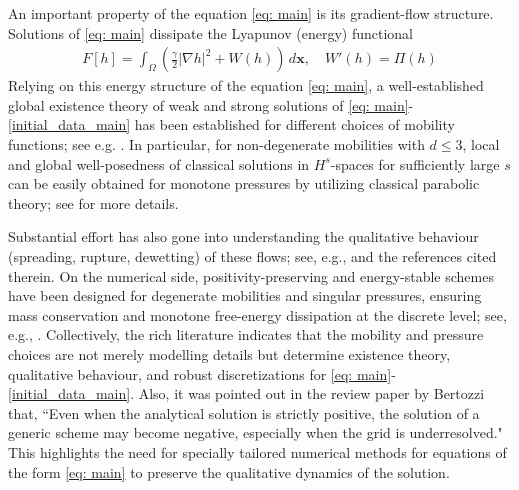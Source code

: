 \documentclass[11pt]{article}
\numberwithin{equation}{section}
\newtheorem{counter example}[theorem]{Counter Example}
\numberwithin{equation}{section}
\numberwithin{equation}{section}
\begin{document}
An important property of the equation \eqref{eq: main} is its gradient-flow structure. Solutions of \eqref{eq: main} dissipate the Lyapunov (energy) functional
\begin{align}\label{energy}
F[h] = \int_{\Omega} \left( \frac{\gamma}{2}|\nabla h|^2 + W(h) \right)\, d\mathbf{x},\quad W'(h)=\Pi(h)
\end{align}
Relying on this energy structure of the equation \eqref{eq: main}, a well-established global existence theory of weak and strong solutions of \eqref{eq: main}-\eqref{initial_data_main} has been established for different choices of mobility functions; see e.g. \cite{elliott1996cahn, giacomelli1999fourth, gnann2018navier, giacomelli2014well, dai2016weak}. In particular, for non-degenerate mobilities with $d\leq 3$, local and global well-posedness of classical solutions in $H^s$-spaces for sufficiently large $s$ can be easily obtained for monotone pressures by utilizing classical parabolic theory; see \cite{bernis1990higher} for more details.

Substantial effort has also gone into understanding the qualitative behaviour (spreading, rupture, dewetting) of these flows; see, e.g., \cite{passo1998fourth,bernis1990higher} and the references cited therein. On the numerical side, positivity-preserving and energy-stable schemes have been designed for degenerate mobilities and singular pressures, ensuring mass conservation and monotone free-energy dissipation at the discrete level; see, e.g., \cite{zhornitskaya1999positivity,grun2000nonnegativity}. Collectively, the rich literature indicates that the mobility and pressure choices are not merely modelling details but determine existence theory, qualitative behaviour, and robust discretizations for \eqref{eq: main}-\eqref{initial_data_main}. Also, it was pointed out in the review paper by Bertozzi \cite{bertozzi1998mathematics} that, ``Even when the analytical solution is strictly positive, the solution of a generic scheme may become negative, especially when the grid is underresolved." This highlights the need for specially tailored numerical methods for equations of the form \eqref{eq: main} to preserve the qualitative dynamics of the solution.
\end{document}
